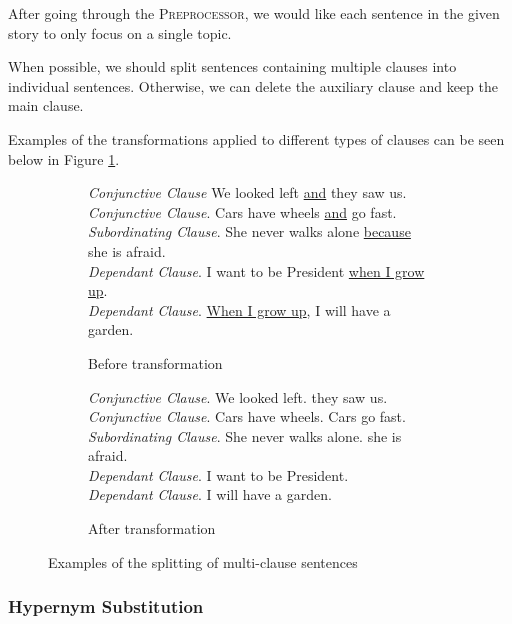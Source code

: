 After going through the \textsc{Preprocessor}, we would like each sentence in the given story to only focus on a single topic.

When possible, we should split sentences containing multiple clauses into individual sentences. Otherwise, we can delete the auxiliary clause and keep the main clause.

Examples of the transformations applied to different types of clauses can be seen below in Figure \ref{fig:clause_transformations}.

\begin{figure}[H]
\begin{subfigure}{\textwidth}
\begin{displayquote}
\textit{Conjunctive Clause} We looked left \underline{and} they saw us.\\
\textit{Conjunctive Clause}. Cars have wheels \underline{and} go fast.\\
\textit{Subordinating Clause}. She never walks alone \underline{because} she is afraid.\\
\textit{Dependant Clause}. I want to be President \underline{when I grow up}.\\
\textit{Dependant Clause}. \underline{When I grow up}, I will have a garden.
\end{displayquote}
\caption{Before transformation}
\vspace{\baselineskip}
\end{subfigure}
\begin{subfigure}{\textwidth}
\begin{displayquote}
\textit{Conjunctive Clause}. We looked left. they saw us.\\
\textit{Conjunctive Clause}. Cars have wheels. Cars go fast.\\
\textit{Subordinating Clause}. She never walks alone. she is afraid.\\
\textit{Dependant Clause}. I want to be President.\\
\textit{Dependant Clause}. I will have a garden.
\caption{After transformation}
\end{displayquote}
\end{subfigure}
\caption{Examples of the splitting of multi-clause sentences}
\label{fig:clause_transformations}
\end{figure}

\subsubsection{Hypernym Substitution}

